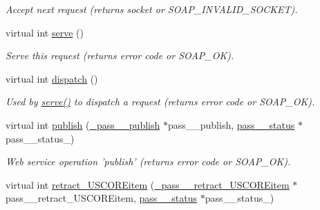 \begin{DoxyCompactItemize}
\begin{DoxyCompactList}\small\item\em Accept next request (returns socket or SOAP\_\-INVALID\_\-SOCKET). \item\end{DoxyCompactList}\item 
\hypertarget{classPASSSubscriberPortBindingService_af1c429c4b1c4dbe29403dece15e6a3ed}{
virtual int \hyperlink{classPASSSubscriberPortBindingService_af1c429c4b1c4dbe29403dece15e6a3ed}{serve} ()}
\label{classPASSSubscriberPortBindingService_af1c429c4b1c4dbe29403dece15e6a3ed}

\begin{DoxyCompactList}\small\item\em Serve this request (returns error code or SOAP\_\-OK). \item\end{DoxyCompactList}\item 
\hypertarget{classPASSSubscriberPortBindingService_a30631162e051b012524a2867373ace97}{
virtual int \hyperlink{classPASSSubscriberPortBindingService_a30631162e051b012524a2867373ace97}{dispatch} ()}
\label{classPASSSubscriberPortBindingService_a30631162e051b012524a2867373ace97}

\begin{DoxyCompactList}\small\item\em Used by \hyperlink{classPASSSubscriberPortBindingService_af1c429c4b1c4dbe29403dece15e6a3ed}{serve()} to dispatch a request (returns error code or SOAP\_\-OK). \item\end{DoxyCompactList}\item 
virtual int \hyperlink{classPASSSubscriberPortBindingService_a3eef20e20bd0cbe7500ab6710a1072e1}{publish} (\hyperlink{class__pass____publish}{\_\-pass\_\-\_\-publish} $\ast$pass\_\-\_\-publish, \hyperlink{classpass____status}{pass\_\-\_\-status} $\ast$pass\_\-\_\-status\_\-)
\begin{DoxyCompactList}\small\item\em Web service operation 'publish' (returns error code or SOAP\_\-OK). \item\end{DoxyCompactList}\item 
\hypertarget{classPASSSubscriberPortBindingService_a4fbcad81f5082b45916b2a8b86c135ea}{
virtual int \hyperlink{classPASSSubscriberPortBindingService_a4fbcad81f5082b45916b2a8b86c135ea}{retract\_\-USCOREitem} (\hyperlink{class__pass____retract__USCOREitem}{\_\-pass\_\-\_\-retract\_\-USCOREitem} $\ast$pass\_\-\_\-retract\_\-USCOREitem, \hyperlink{classpass____status}{pass\_\-\_\-status} $\ast$pass\_\-\_\-status\_\-)}
\label{classPASSSubscriberPortBindingService_a4fbcad81f5082b45916b2a8b86c135ea}


\end{DoxyCompactItemize}
